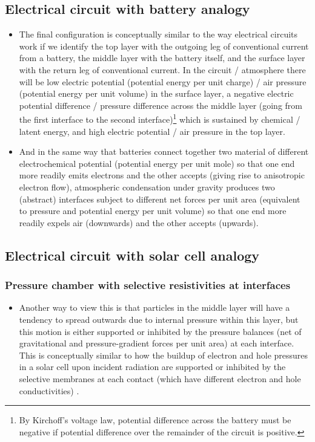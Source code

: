 \subsection{Electrical circuit with battery analogy}

\begin{itemize}
	\item The final configuration is conceptually similar to the way electrical circuits work if we identify the top layer with the outgoing leg of conventional current from a battery, the middle layer with the battery itself, and the surface layer with the return leg of conventional current. In the circuit / atmosphere there will be low electric potential (potential energy per unit charge) / air pressure (potential energy per unit volume) in the surface layer, a negative electric potential difference / pressure difference across the middle layer (going from the first interface to the second interface)\footnote{By Kirchoff’s voltage law, potential difference across the battery must be negative if potential difference over the remainder of the circuit is positive.} which is sustained by chemical / latent energy, and high electric potential / air pressure in the top layer.
	\item And in the same way that batteries connect together two material of different electrochemical potential (potential energy per unit mole) so that one end more readily emits electrons and the other accepts (giving rise to anisotropic electron flow), atmospheric condensation under gravity produces two (abstract) interfaces subject to different net forces per unit area (equivalent to pressure and potential energy per unit volume) so that one end more readily expels air (downwards) and the other accepts (upwards).
\end{itemize}

\subsection{Electrical circuit with solar cell analogy}

\subsubsection{Pressure chamber with selective resistivities at interfaces}

\begin{itemize}
	\item Another way to view this is that particles in the middle layer will have a tendency to spread outwards due to internal pressure within this layer, but this motion is either supported or inhibited by the pressure balances (net of gravitational and pressure-gradient forces per unit area) at each interface. This is conceptually similar to how the buildup of electron and hole pressures in a solar cell upon incident radiation are supported or inhibited by the selective membranes at each contact (which have different electron and hole conductivities) \citep{wurfel2016}.
\end{itemize}

